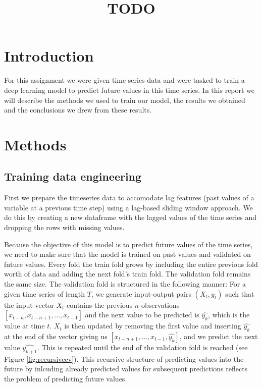 \documentclass[conference]{IEEEtran}
\begin{document}
\title{TODO}

\author{
\IEEEauthorblockA{}
\and
{}
\and
{}
\and
{}
}

\maketitle

\section{Introduction}
For this assignment we were given time series data and were tasked to train a deep learning model
to predict future values in this time series. In this report we will describe the methods we used 
to train our model, the results we obtained and the conclusions we drew from these results.

\section{Methods}
\subsection{Training data engineering}
First we prepare the timeseries data to accomodate lag features (past values of a variable at a
previous time step) using a lag-based sliding window approach. We do this by creating a new 
dataframe with the lagged values of the time series and dropping the rows with missing values.

Because the objective of this model is to predict future values of the time series, we need to
make sure that the model is trained on past values and validated on future values. Every fold the 
train fold grows by including the entire previous fold worth of data and adding the next fold's train fold.  
The validation fold remains the same size. The validation fold is structured in the following manner:
For a given time series of length $T$, we generate input-output pairs $(X_t,y_t)$ such that the 
input vector $X_t$ contains the previous $n$ observations $[x_{t-n}, x_{t-n+1}, \ldots, x_{t-1}]$ 
and the next value to be predicted is $\hat{y_k}$, which is the value at time $t$. $X_t$ is then 
updated by removing the first value and inserting $\hat{y_k}$ at the end of the vector giving us
$[x_{t-n+1}, \ldots, x_{t-1}, \hat{y_k}]$, and we predict the next value $\hat{y_{k+1}}$. This is 
repeated until the end of the validation fold is reached (see Figure \ref{fig:recursivecv}). This recursive structure of predicting 
values into the future by inlcuding already predicted values for subsequent predictions reflects 
the problem of predicting future values. 
\end{document}

